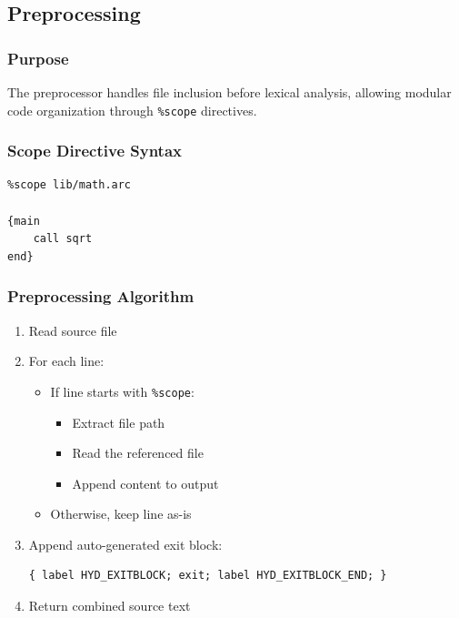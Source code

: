 \documentclass[11pt,a4paper]{article}
\begin{document}
\subsection{Preprocessing}

\subsubsection{Purpose}

The preprocessor handles file inclusion before lexical analysis, allowing modular code organization through \texttt{\%scope} directives.

\subsubsection{Scope Directive Syntax}

\begin{verbatim}
%scope lib/math.arc

{main
    call sqrt
end}
\end{verbatim}

\subsubsection{Preprocessing Algorithm}

\begin{enumerate}
    \item Read source file
    \item For each line:
    \begin{itemize}
        \item If line starts with \texttt{\%scope}:
        \begin{itemize}
            \item Extract file path
            \item Read the referenced file
            \item Append content to output
        \end{itemize}
        \item Otherwise, keep line as-is
    \end{itemize}
    \item Append auto-generated exit block:
    \begin{verbatim}
{ label HYD_EXITBLOCK; exit; label HYD_EXITBLOCK_END; }
    \end{verbatim}
    \item Return combined source text
\end{enumerate}
\end{document}
